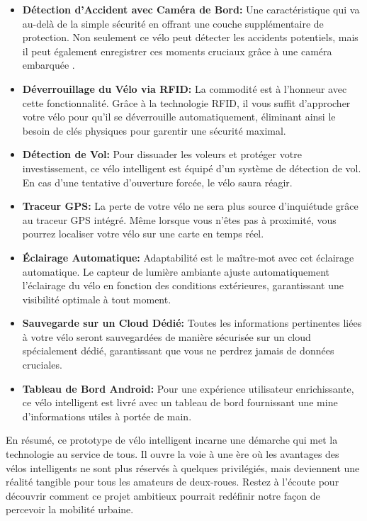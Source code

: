 \begin{itemize}
	\item \textbf{Détection d'Accident avec Caméra de Bord:} Une caractéristique qui va au-delà de la simple sécurité en offrant une couche supplémentaire de protection. Non seulement ce vélo peut détecter les accidents potentiels, mais il peut également enregistrer ces moments cruciaux grâce à une caméra embarquée .
	\item \textbf{Déverrouillage du Vélo via RFID:} La commodité est à l'honneur avec cette fonctionnalité. Grâce à la technologie RFID, il vous suffit d'approcher votre vélo pour qu'il se déverrouille automatiquement, éliminant ainsi le besoin de clés physiques pour garentir une sécurité maximal.
	\item \textbf{Détection de Vol:} Pour dissuader les voleurs et protéger votre investissement, ce vélo intelligent est équipé d'un système de détection de vol. En cas d'une tentative d'ouverture forcée, le vélo saura réagir.
	\item \textbf{Traceur GPS:} La perte de votre vélo ne sera plus source d'inquiétude grâce au traceur GPS intégré. Même lorsque vous n'êtes pas à proximité, vous pourrez localiser votre vélo sur une carte en temps réel.
	\item \textbf{Éclairage Automatique:} Adaptabilité est le maître-mot avec cet éclairage automatique. Le capteur de lumière ambiante ajuste automatiquement l'éclairage du vélo en fonction des conditions extérieures, garantissant une visibilité optimale à tout moment.
	\item \textbf{Sauvegarde sur un Cloud Dédié:} Toutes les informations pertinentes liées à votre vélo seront sauvegardées de manière sécurisée sur un cloud spécialement dédié, garantissant que vous ne perdrez jamais de données cruciales.
	\item \textbf{Tableau de Bord Android:} Pour une expérience utilisateur enrichissante, ce vélo intelligent est livré avec un tableau de bord fournissant une mine d'informations utiles à portée de main.
\end{itemize}

En résumé, ce prototype de vélo intelligent incarne une démarche qui met la technologie au service de tous. Il ouvre la voie à une ère où les avantages des vélos intelligents ne sont plus réservés à quelques privilégiés, mais deviennent une réalité tangible pour tous les amateurs de deux-roues. Restez à l'écoute pour découvrir comment ce projet ambitieux pourrait redéfinir notre façon de percevoir la mobilité urbaine.
